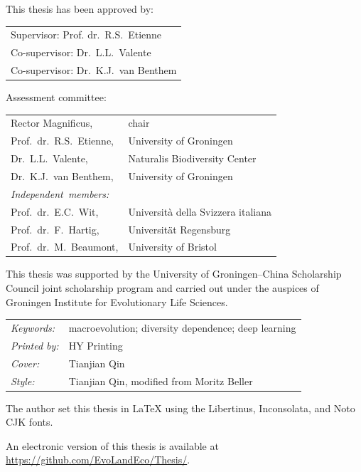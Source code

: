 \begin{titlepage}
\noindent This thesis has been approved by:

\medskip\noindent
\begin{tabular}{l}
    Supervisor: Prof. dr.\ R.S.\ Etienne \\
    Co-supervisor: Dr.\ L.L.\ Valente \\
    Co-supervisor: Dr.\ K.J.\ van Benthem
\end{tabular}

\bigskip
\noindent Assessment committee:

\begin{tabular}{p{4.5cm}l}
    Rector Magnificus, & chair \\
    Prof.\ dr.\ R.S.\ Etienne, & University of Groningen \\
    Dr.\ L.L.\ Valente, & Naturalis Biodiversity Center \\
    Dr.\ K.J.\ van Benthem, & University of Groningen \\

    \medskip
    \mbox{\emph{Independent members:}} & \\
    Prof.\ dr.\ E.C.\ Wit, & Università della Svizzera italiana \\
    Prof.\ dr.\ F.\ Hartig, & Universität Regensburg \\
    Prof.\ dr.\ M.\ Beaumont, & University of Bristol \\
\end{tabular}

\medskip\medskip
\noindent This thesis was supported by the University of Groningen--China Scholarship Council joint scholarship program and carried out under the auspices of Groningen Institute for Evolutionary Life Sciences.

\medskip
\noindent
\begin{tabular}{@{}p{}@{}p{}}
  \textit{Keywords:} & macroevolution; diversity dependence; deep learning \\[\medskipamount]
  \textit{Printed by:} & HY Printing \\[\medskipamount]
  \textit{Cover:} & Tianjian Qin \\[\medskipamount]
  \textit{Style:} & Tianjian Qin, modified from Moritz Beller \\[\medskipamount]
\end{tabular}

\medskip\medskip
\noindent The author set this thesis in \LaTeX\xspace using the Libertinus, Inconsolata, and Noto CJK fonts.

\vspace{\bigskipamount}

\medskip
\noindent An electronic version of this thesis is available at \\
\url{https://github.com/EvoLandEco/Thesis/}.

\end{titlepage}

